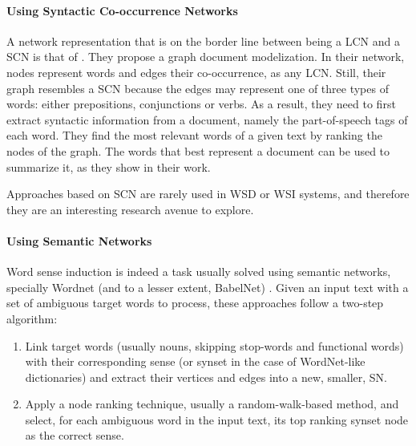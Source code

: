 \paragraph{Using Syntactic Co-occurrence Networks}

A network representation that is on the border line between being a LCN and a SCN is that of \cite{2013.Bronselaer.TextAnalysisWithGraphs}. They  propose a graph document modelization. In their network, nodes represent words and edges their co-occurrence, as any LCN. Still, their graph resembles a SCN because the edges may represent one of three types of words: either prepositions, conjunctions or verbs. As a result,  they need to first extract syntactic information from a document, namely the part-of-speech tags of each word. They find the most relevant words of a given text by ranking the nodes of the graph. The words that best represent a document can be used to summarize it, as they show in their work.

Approaches based on SCN are rarely used in WSD or WSI systems, and therefore they are an interesting research avenue to explore.




\paragraph{Using Semantic Networks}

Word sense induction is indeed a task usually solved using semantic networks, specially Wordnet (and to a lesser extent, BabelNet) \cite{2004.Mihalcea.SemanticNetworkPageRank,2007.Sinha.Mihalcea.Unsupervised,2007.Tsatsaronis.WSDwithSpreading,2007.Navigli.GraphConnectivity,2008.Agirre.Multilingual,2008.Klapaftis.WSIUsingCollocations,2009.Agirre.PersonalizedPageRankWSD,2010.Klapaftis.WSD.WSD.HierarchicalGraphs,2010.Siberer.GraphCooccurrenceWSD,2014.Moro.Navigli.EntityLinking_WSD}. Given an input text with a set of ambiguous target words to process, these approaches follow a two-step algorithm:
\begin{enumerate}
\item Link target words (usually nouns, skipping stop-words and functional words) with their corresponding  sense (or synset in the case of WordNet-like dictionaries) and extract their vertices and edges into a new, smaller, SN. 
\item Apply a node ranking technique, usually a random-walk-based method, and select, for each ambiguous word in the input text,  its top ranking synset node as the correct sense.
\end{enumerate}

